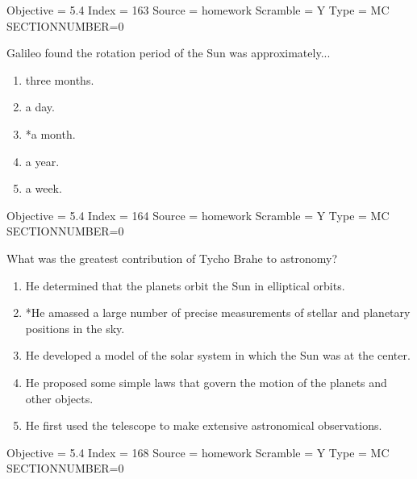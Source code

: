 \documentclass[11pt]{article}
\begin{document}
\begin{enumerate}
\begin{minipage}{\textwidth}
\begin{minipage}{\textwidth}
Objective = 5.4
Index = 163
Source = homework
Scramble = Y
Type = MC
SECTIONNUMBER=0
\end{minipage}
\end{minipage}
\vskip 0.20in

\begin{minipage}{\textwidth}
\begin{minipage}{\textwidth}
\item Galileo found the rotation period of the Sun was approximately...
\begin{multicols}{3}
\begin{enumerate} 
\setlength{\itemsep}{1pt} 
\setlength{\parskip}{0pt} 
\setlength{\parsep}{0pt}
\setlength{\multicolsep}{1pt} 
\item three months.
\item a day.
\item *a month.
\item a year.
\item a week.
\end{enumerate} 
\vfill 
\end{multicols}

Objective = 5.4
Index = 164
Source = homework
Scramble = Y
Type = MC
SECTIONNUMBER=0
\end{minipage}
\end{minipage}
\vskip 0.20in

\begin{minipage}{\textwidth}
\begin{minipage}{\textwidth}
\item What was the greatest contribution of Tycho Brahe to astronomy?
\begin{enumerate} 
\setlength{\itemsep}{1pt} 
\setlength{\parskip}{0pt} 
\setlength{\parsep}{0pt}
\setlength{\multicolsep}{1pt} 
\item He determined that the planets orbit the Sun in elliptical orbits.
\item *He amassed a large number of precise measurements of stellar and planetary positions in the sky.
\item He developed a model of the solar system in which the Sun was at the center.
\item He proposed some simple laws that govern the motion of the planets and other objects.
\item He first used the telescope to make extensive astronomical observations.
\end{enumerate} 
Objective = 5.4
Index = 168
Source = homework
Scramble = Y
Type = MC
SECTIONNUMBER=0
\end{minipage}
\end{minipage}
\vskip 0.20in


\end{enumerate}
\end{document}
